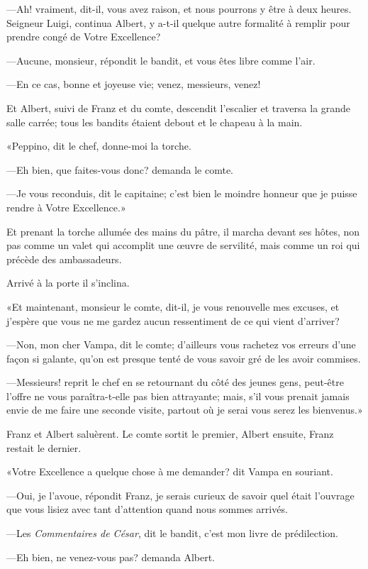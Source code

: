 —Ah! vraiment, dit-il, vous avez raison, et nous pourrons y être à deux heures. Seigneur Luigi, continua Albert, y a-t-il quelque autre formalité à remplir pour prendre congé de Votre Excellence? 

—Aucune, monsieur, répondit le bandit, et vous êtes libre comme l'air. 

—En ce cas, bonne et joyeuse vie; venez, messieurs, venez! 

Et Albert, suivi de Franz et du comte, descendit l'escalier et traversa la grande salle carrée; tous les bandits étaient debout et le chapeau à la main. 

«Peppino, dit le chef, donne-moi la torche. 

—Eh bien, que faites-vous donc? demanda le comte. 

—Je vous reconduis, dit le capitaine; c'est bien le moindre honneur que je puisse rendre à Votre Excellence.» 

Et prenant la torche allumée des mains du pâtre, il marcha devant ses hôtes, non pas comme un valet qui accomplit une œuvre de servilité, mais comme un roi qui précède des ambassadeurs. 

Arrivé à la porte il s'inclina. 

«Et maintenant, monsieur le comte, dit-il, je vous renouvelle mes excuses, et j'espère que vous ne me gardez aucun ressentiment de ce qui vient d'arriver? 

—Non, mon cher Vampa, dit le comte; d'ailleurs vous rachetez vos erreurs d'une façon si galante, qu'on est presque tenté de vous savoir gré de les avoir commises. 

—Messieurs! reprit le chef en se retournant du côté des jeunes gens, peut-être l'offre ne vous paraîtra-t-elle pas bien attrayante; mais, s'il vous prenait jamais envie de me faire une seconde visite, partout où je serai vous serez les bienvenus.» 

Franz et Albert saluèrent. Le comte sortit le premier, Albert ensuite, Franz restait le dernier. 

«Votre Excellence a quelque chose à me demander? dit Vampa en souriant. 

—Oui, je l'avoue, répondit Franz, je serais curieux de savoir quel était l'ouvrage que vous lisiez avec tant d'attention quand nous sommes arrivés. 

—Les \textit{Commentaires de César}, dit le bandit, c'est mon livre de prédilection.  

—Eh bien, ne venez-vous pas? demanda Albert. 

